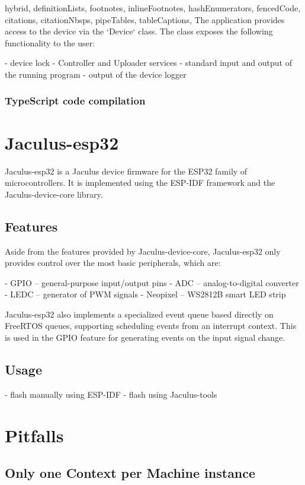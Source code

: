 \documentclass[
  digital,
  oneside,
  nosansbold,
  nocolorbold,
  lof,
  lot
]{fithesis4}
\begin{document}
\begin{markdown*}{%
  hybrid,
  definitionLists,
  footnotes,
  inlineFootnotes,
  hashEnumerators,
  fencedCode,
  citations,
  citationNbsps,
  pipeTables,
  tableCaptions,
}
The application provides access to the device via the `Device` class. The class exposes the following functionality to the user:

  - device lock
  - Controller and Uploader services
  - standard input and output of the running program
  - output of the device logger

\subsection{TypeScript code compilation}



\chapter{Jaculus-esp32}

Jaculus-esp32 is a Jaculus device firmware for the ESP32 family of microcontrollers. It is implemented using the ESP-IDF framework and the Jaculus-device-core library.

\section{Features}

Aside from the features provided by Jaculus-device-core, Jaculus-esp32 only provides control over the most basic peripherals, which are:

  - GPIO -- general-purpose input/output pins
  - ADC -- analog-to-digital converter
  - LEDC -- generator of PWM signals
  - Neopixel -- WS2812B smart LED strip

Jaculus-esp32 also implements a specialized event queue based directly on FreeRTOS queues, supporting scheduling events from an interrupt context. This is used in the GPIO feature for generating events on the input signal change.


\section{Usage}

  - flash manually using ESP-IDF
  - flash using Jaculus-tools


\chapter{Pitfalls}

\section{Only one Context per Machine instance}


\end{markdown*}
\end{document}
